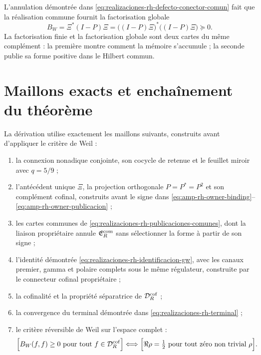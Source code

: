 L'annulation démontrée dans
\eqref{eq:realizaciones-rh-defecto-conector-comun} fait que la réalisation
commune fournit la factorisation globale
\begin{equation}\label{eq:realizaciones-rh-factorizacion-global}
 B_W=\Xi^*(I-P)\Xi
 =\bigl((I-P)\Xi\bigr)^*\bigl((I-P)\Xi\bigr)\succeq0.
\end{equation}
La factorisation finie et la factorisation globale sont deux cartes du même complément :
la première montre comment la mémoire s'accumule ; la seconde publie sa forme
positive dans le Hilbert commun.

\section*{Maillons exacts et enchaînement du théorème}

La dérivation utilise exactement les maillons suivants, construits
avant d'appliquer le critère de Weil :
\begin{enumerate}
 \item la connexion nonadique conjointe, son cocycle de retenue et le feuillet miroir
       avec \(q=5/9\) ;
 \item l'antécédent unique \(\Xi\), la projection orthogonale
       \(P=P^*=P^2\) et son complément cofinal, construits avant le signe
       dans \eqref{eq:amp-rh-owner-binding}--\eqref{eq:amp-rh-owner-publicacion} ;
 \item les cartes communes de
       \eqref{eq:realizaciones-rh-publicaciones-comunes}, dont la liaison
       propriétaire annule \(\mathfrak E_R^{\rm com}\) sans sélectionner la
       forme à partir de son signe ;
 \item l'identité démontrée
       \eqref{eq:realizaciones-rh-identificacion-gw}, avec les canaux premier,
       gamma et polaire complets sous le même régulateur, construite par le
       connecteur cofinal propriétaire ;
 \item la cofinalité et la propriété séparatrice de
       \(\mathcal D_R^{\rm cof}\) ;
 \item la convergence du terminal démontrée dans
       \eqref{eq:realizaciones-rh-terminal} ;
 \item le critère réversible de Weil sur l'espace complet :
 \begin{equation}\label{eq:realizaciones-rh-criterio}
  \Bigl[B_W(f,f)\geq0
  \ \text{pour tout }f\in\mathcal D_R^{\rm cof}\Bigr]
  \Longleftrightarrow
  \Bigl[\Re\rho=\tfrac12
  \ \text{pour tout zéro non trivial }\rho\Bigr].
 \end{equation}
\end{enumerate}

